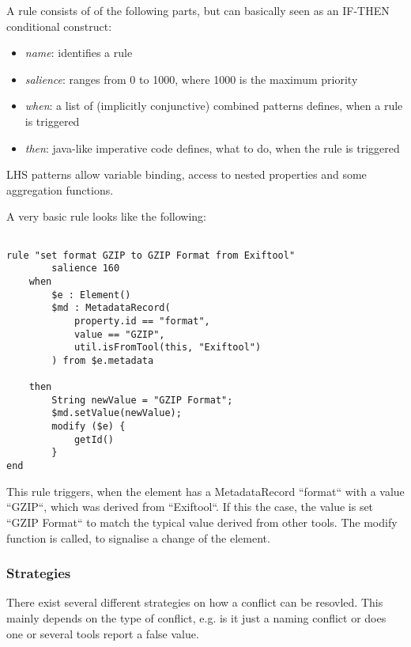 \documentclass[a4paper,12pt]{article}
\begin{document}
A rule consists of of the following parts, but can basically seen as an IF-THEN conditional construct:
\begin{itemize}
\item \emph{name}: identifies a rule
\item \emph{salience}: ranges from 0 to 1000, where 1000 is the maximum priority
\item \emph{when}: a list of (implicitly conjunctive) combined patterns defines, when a rule is triggered
\item \emph{then}: java-like imperative code defines, what to do, when the rule is triggered
\end{itemize}

LHS patterns allow variable binding, access to nested properties and some aggregation functions.

A very basic rule looks like the following:
\begin{lstlisting}

rule "set format GZIP to GZIP Format from Exiftool"
        salience 160
    when 
        $e : Element()
        $md : MetadataRecord(
            property.id == "format", 
            value == "GZIP",
            util.isFromTool(this, "Exiftool")
        ) from $e.metadata

    then
        String newValue = "GZIP Format";
        $md.setValue(newValue);
        modify ($e) {
            getId()
        }
end
\end{lstlisting}

This rule triggers, when the element has a MetadataRecord ``format`` with a value ``GZIP``, which was derived from ``Exiftool``. If this the case, the value is set ``GZIP Format`` to match the typical value derived from other tools.
The modify function is called, to signalise a change of the element.

\subsubsection{Strategies}

There exist several different strategies on how a conflict can be resovled. This mainly depends on the type of conflict, e.g. is it just a naming conflict or does one or several tools report a false value.
\end{document}
